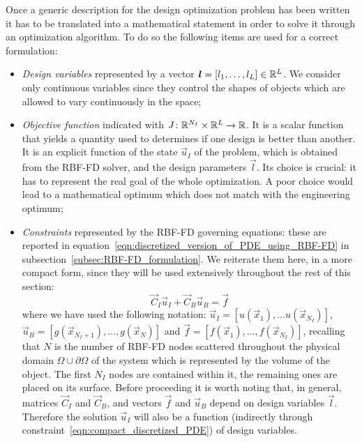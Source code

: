Once a generic description for the design optimization problem has been written it has to be translated into a mathematical statement in order to solve it through an optimization algorithm. To do so the following items are used for a correct formulation:
\begin{itemize}
	\item \emph{Design variables} represented by a vector $\boldsymbol{l} = \left[ l_1, \dots, l_L \right] \in \mathbb{R}^L$. We consider only continuous variables since they control the shapes of objects which are allowed to vary continuously in the space;
	
	\item \emph{Objective function} indicated with $J \colon \mathbb{R}^{N_I}\times\mathbb{R}^L \to \mathbb{R}$. It is a scalar function that yields a quantity used to determines if one design is better than another. It is an explicit function of the state $\vec{u}_I$ of the problem, which is obtained from the RBF-FD solver, and the design parameters $\vec{l}$. Its choice is crucial: it has to represent the real goal of the whole optimization. A poor choice would lead to a mathematical optimum which does not match with the engineering optimum;
	
	\item \emph{Constraints} represented by the RBF-FD governing equations: these are reported in equation~\eqref{eqn:discretized_version_of_PDE_using_RBF-FD} in subsection~\ref{subsec:RBF-FD_formulation}. We reiterate them here, in a more compact form, since they will be used extensively throughout the rest of this section:
	\begin{equation}
		\label{eqn:compact_discretized_PDE}
		\vec{C}_I \vec{u}_I + \vec{C}_B \vec{u}_B = \vec{f}
	\end{equation}
	where we have used the following notation: $\vec{u}_I = \left[ u(\vec{x}_1), \dots u(\vec{x}_{N_I}) \right]$, $\vec{u}_B = \left[ g(\vec{x}_{N_I+1}), \dots, g(\vec{x}_N) \right]$ and $\vec{f} = \left[ f(\vec{x}_1), \dots, f(\vec{x}_{N_I}) \right]$, recalling that $N$ is the number of RBF-FD nodes scattered throughout the physical domain $\Omega\cup\partial\Omega$ of the system which is represented by the volume of the object. The first $N_I$ nodes are contained within it, the remaining ones are placed on its surface.
	Before proceeding it is worth noting that, in general, matrices $\vec{C}_I$ and $\vec{C}_B$, and vectors $\vec{f}$ and $\vec{u}_B$ depend on design variables $\vec{l}$. Therefore the solution $\vec{u}_I$ will also be a function (indirectly through constraint~\eqref{eqn:compact_discretized_PDE}) of design variables.
\end{itemize}
